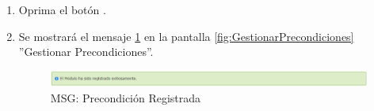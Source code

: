\begin{enumerate}
			\item Oprima el botón \IUAceptar.
			
			\item Se mostrará el mensaje \ref{fig:precondicionRegistrada} en la pantalla \ref{fig:GestionarPrecondiciones} ''Gestionar Precondiciones''.
			
			\begin{figure}[htbp!]
				\begin{center}
					\includegraphics[scale=0.6]{roles/lider/casosUso/pantallas/IU5-1MSG1}
					\caption{MSG: Precondición Registrada}
					\label{fig:precondicionRegistrada}
				\end{center}
			\end{figure}
			\end{enumerate}